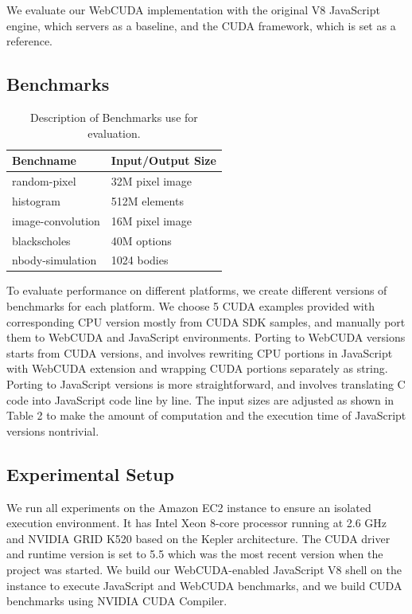 We evaluate our WebCUDA implementation with the original V8 JavaScript engine, which servers as a baseline, and the CUDA framework, which is set as a reference.

\subsection{Benchmarks}
\begin{table}
	\begin{center}
		\begin{tabular}{| l | l |}
			\hline
			Benchname & Input/Output Size \\
			\hline
			random-pixel & 32M pixel image \\
			\hline
			histogram & 512M elements \\
			\hline
			image-convolution & 16M pixel image \\
			\hline
			blackscholes & 40M options \\
			\hline
			nbody-simulation & 1024 bodies \\
			\hline
		\end{tabular}
	\end{center}
	\caption{Description of Benchmarks use for evaluation.}
	\label{benchmark-table}
\end{table}

To evaluate performance on different platforms, we create different versions of benchmarks for each platform. We choose 5 CUDA examples provided with corresponding CPU version mostly from CUDA SDK samples, and manually port them to WebCUDA and JavaScript environments. Porting to WebCUDA versions starts from CUDA versions, and involves rewriting CPU portions in JavaScript with WebCUDA extension and wrapping CUDA portions separately as string. Porting to JavaScript versions is more
straightforward, and involves translating C code into JavaScript code line by line.
The input sizes are adjusted as shown in Table 2 to make the amount of computation and the execution time of JavaScript versions nontrivial.

\subsection{Experimental Setup}
We run all experiments on the Amazon EC2 instance to ensure an isolated execution environment. It has Intel Xeon 8-core processor running at 2.6 GHz and NVIDIA GRID K520 based on the Kepler architecture. The CUDA driver and runtime version is set to 5.5 which was the most recent version when the project was started. We build our WebCUDA-enabled JavaScript V8 shell on the instance to execute JavaScript and WebCUDA benchmarks, and we build CUDA benchmarks using NVIDIA CUDA Compiler.

